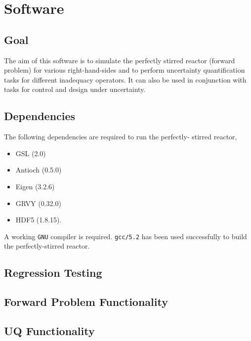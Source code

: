 \section{Software}

\subsection{Goal}
The aim of this software is to simulate the perfectly stirred 
reactor (forward problem) for various right-hand-sides and to 
perform uncertainty quantification tasks for different 
inadequacy operators.  It can also be used in conjunction with 
tasks for control and design under uncertainty.

\subsection{Dependencies}
The following dependencies are required to run the perfectly-
stirred reactor,
\begin{itemize}
  \item GSL     (2.0)
  \item Antioch (0.5.0) 
  \item Eigen (3.2.6)
  \item GRVY (0.32.0)
  \item HDF5 (1.8.15).
\end{itemize}
A working \texttt{GNU} compiler is required.  \texttt{gcc/5.2} 
has been used successfully to build the perfectly-stirred 
reactor.

\subsection{Regression Testing}

\subsection{Forward Problem Functionality}

\subsection{UQ Functionality}
